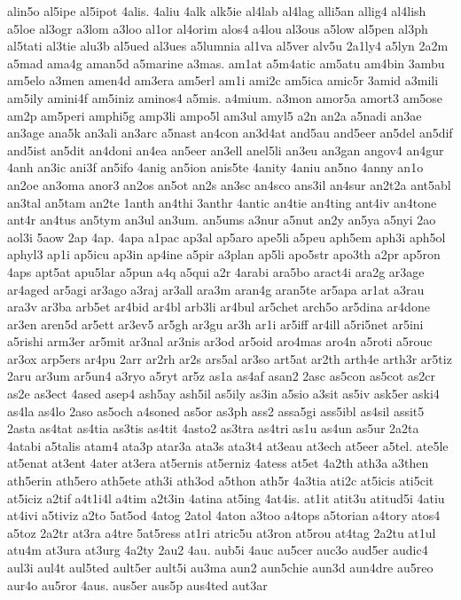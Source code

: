 {alin5o
al5ipe
al5ipot
4alis.
4aliu
4alk
alk5ie
al4lab
al4lag
alli5an
allig4
al4lish
a5loe
al3ogr
a3lom
a3loo
al1or
al4orim
alos4
a4lou
al3ous
a5low
al5pen
al3ph
al5tati
al3tie
alu3b
al5ued
al3ues
a5lumnia
al1va
al5ver
alv5u
2a1ly4
a5lyn
2a2m
a5mad
ama4g
aman5d
a5marine
a3mas.
am1at
a5m4atic
am5atu
am4bin
3ambu
am5elo
a3men
amen4d
am3era
am5erl
am1i
ami2c
am5ica
amic5r
3amid
a3mili
am5ily
amini4f
am5iniz
aminos4
a5mis.
a4mium.
a3mon
amor5a
amort3
am5ose
am2p
am5peri
amphi5g
amp3li
ampo5l
am3ul
amyl5
a2n
an2a
a5nadi
an3ae
an3age
ana5k
an3ali
an3arc
a5nast
an4con
an3d4at
and5au
and5eer
an5del
an5dif
and5ist
an5dit
an4doni
an4ea
an5eer
an3ell
anel5li
an3eu
an3gan
angov4
an4gur
4anh
an3ic
ani3f
an5ifo
4anig
an5ion
anis5te
4anity
4aniu
an5no
4anny
an1o
an2oe
an3oma
anor3
an2os
an5ot
an2s
an3sc
an4sco
ans3il
an4sur
an2t2a
ant5abl
an3tal
an5tam
an2te
1anth
an4thi
3anthr
4antic
an4tie
an4ting
ant4iv
an4tone
ant4r
an4tus
an5tym
an3ul
an3um.
an5ums
a3nur
a5nut
an2y
an5ya
a5nyi
2ao
aol3i
5aow
2ap
4ap.
4apa
a1pac
ap3al
ap5aro
ape5li
a5peu
aph5em
aph3i
aph5ol
aphyl3
ap1i
ap5icu
ap3in
ap4ine
a5pir
a3plan
ap5li
apo5str
apo3th
a2pr
ap5ron
4aps
apt5at
apu5lar
a5pun
a4q
a5qui
a2r
4arabi
ara5bo
aract4i
ara2g
ar3age
ar4aged
ar5agi
ar3ago
a3raj
ar3all
ara3m
aran4g
aran5te
ar5apa
ar1at
a3rau
ara3v
ar3ba
arb5et
ar4bid
ar4bl
arb3li
ar4bul
ar5chet
arch5o
ar5dina
ar4done
ar3en
aren5d
ar5ett
ar3ev5
ar5gh
ar3gu
ar3h
ar1i
ar5iff
ar4ill
a5ri5net
ar5ini
a5rishi
arm3er
ar5mit
ar3nal
ar3nis
ar3od
ar5oid
aro4mas
aro4n
a5roti
a5rouc
ar3ox
arp5ers
ar4pu
2arr
ar2rh
ar2s
ars5al
ar3so
art5at
ar2th
arth4e
arth3r
ar5tiz
2aru
ar3um
ar5un4
a3ryo
a5ryt
ar5z
as1a
as4af
asan2
2asc
as5con
as5cot
as2cr
as2e
as3ect
4ased
asep4
ash5ay
ash5il
as5ily
as3in
a5sio
a3sit
as5iv
ask5er
aski4
as4la
as4lo
2aso
as5och
a4soned
as5or
as3ph
ass2
assa5gi
ass5ibl
as4sil
assit5
2asta
as4tat
as4tia
as3tis
as4tit
4asto2
as3tra
as4tri
as1u
as4un
as5ur
2a2ta
4atabi
a5talis
atam4
ata3p
atar3a
ata3s
ata3t4
at3eau
at3ech
at5eer
a5tel.
ate5le
at5enat
at3ent
4ater
at3era
at5ernis
at5erniz
4atess
at5et
4a2th
ath3a
a3then
ath5erin
ath5ero
ath5ete
ath3i
ath3od
a5thon
ath5r
4a3tia
ati2c
at5icis
ati5cit
at5iciz
a2tif
a4t1i4l
a4tim
a2t3in
4atina
at5ing
4at4is.
at1it
atit3u
atitud5i
4atiu
at4ivi
a5tiviz
a2to
5at5od
4atog
2atol
4aton
a3too
a4tops
a5torian
a4tory
atos4
a5toz
2a2tr
at3ra
a4tre
5at5ress
at1ri
atric5u
at3ron
at5rou
at4tag
2a2tu
at1ul
atu4m
at3ura
at3urg
4a2ty
2au2
4au.
aub5i
4auc
au5cer
auc3o
aud5er
audic4
aul3i
aul4t
aul5ted
ault5er
ault5i
au3ma
aun2
aun5chie
aun3d
aun4dre
au5reo
aur4o
au5ror
4aus.
aus5er
aus5p
aus4ted
aut3ar
}
